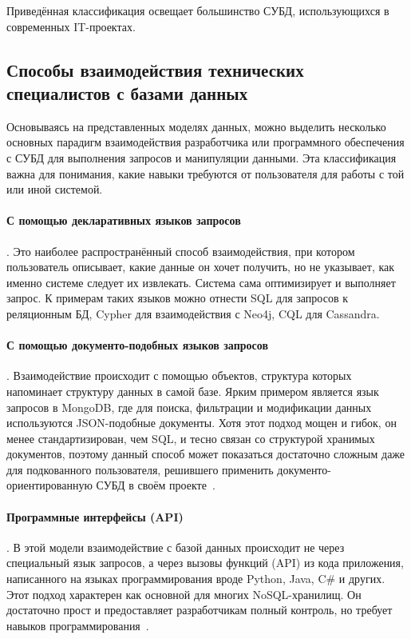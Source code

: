 Приведённая классификация освещает большинство СУБД, использующихся в современных IT-проектах.




\subsection{Способы взаимодействия технических специалистов с базами данных}

Основываясь на представленных моделях данных, можно выделить несколько основных парадигм взаимодействия
разработчика или программного обеспечения с СУБД для выполнения запросов и манипуляции данными.
Эта классификация важна для понимания, какие навыки требуются от пользователя для работы с той или иной системой.

\paragraph{С помощью декларативных языков запросов}. Это наиболее распространённый способ взаимодействия,
при котором пользователь описывает, какие данные он хочет получить, но не указывает,
как именно системе следует их извлекать. Система сама оптимизирует и выполняет запрос.
К примерам таких языков можно отнести SQL для запросов к реляционным БД, Cypher для взаимодействия с Neo4j, CQL для Cassandra.

\paragraph{С помощью документо-подобных языков запросов}. Взаимодействие происходит с помощью объектов,
структура которых напоминает структуру данных в самой базе.
Ярким примером является язык запросов в MongoDB, где для поиска, фильтрации и модификации данных
используются JSON-подобные документы. Хотя этот подход мощен и гибок, он менее стандартизирован,
чем SQL, и тесно связан со структурой хранимых документов, поэтому данный способ может показаться достаточно
сложным даже для подкованного пользователя, решившего применить документо-ориентированную СУБД в своём
проекте~\cite{yakushinSravnitelnyyAnalizRelyacionnoy2018}.

\paragraph{Программные интерфейсы (API)}. В этой модели взаимодействие с базой данных происходит
не через специальный язык запросов, а через вызовы функций (API) из кода приложения,
написанного на языках программирования вроде Python, Java, C\# и других.
Этот подход характерен как основной для многих NoSQL-хранилищ.
Он достаточно прост и предоставляет разработчикам полный контроль, но требует навыков
программирования~\cite{yakushinSravnitelnyyAnalizRelyacionnoy2018,
      ivanovObzorSovremennyhNoSQL2019}.

